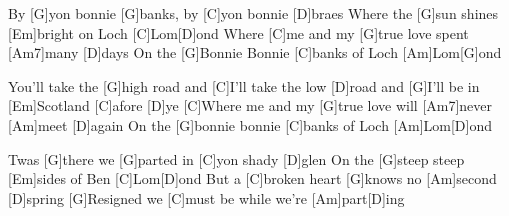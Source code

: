 \beginverse
By [G]yon bonnie [G]banks, by [C]yon bonnie [D]braes
Where the [G]sun shines [Em]bright on Loch [C]Lom[D]ond
Where [C]me and my [G]true love spent [Am7]many [D]days
On the [G]Bonnie Bonnie [C]banks of Loch [Am]Lom[G]ond
\endverse

\beginchorus
[G]You'll take the [G]high road and
[C]I'll take the low [D]road and [G]I'll be in [Em]Scotland [C]afore [D]ye
[C]Where me and my [G]true love will [Am7]never [Am]meet [D]again
On the [G]bonnie bonnie [C]banks of Loch [Am]Lom[D]ond
\endchorus

\beginverse
Twas [G]there we [G]parted in [C]yon shady [D]glen
On the [G]steep steep [Em]sides of Ben [C]Lom[D]ond
But a [C]broken heart [G]knows no [Am]second [D]spring
[G]Resigned we [C]must be while we're [Am]part[D]ing
\endverse


\endsong